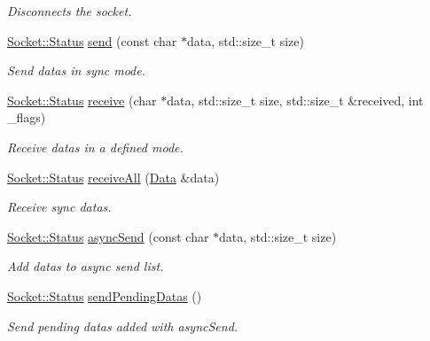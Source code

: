 \begin{DoxyCompactItemize}
\begin{DoxyCompactList}\small\item\em Disconnects the socket. \end{DoxyCompactList}\item 
\hyperlink{classmognetwork_1_1_socket_aa187a8394ac0d6203af0ec7f021ca15f}{Socket\-::\-Status} \hyperlink{classmognetwork_1_1_tcp_socket_a6cd80d53f05a4d91ed1a66e17e9a3d54}{send} (const char $\ast$data, std\-::size\-\_\-t size)
\begin{DoxyCompactList}\small\item\em Send datas in sync mode. \end{DoxyCompactList}\item 
\hyperlink{classmognetwork_1_1_socket_aa187a8394ac0d6203af0ec7f021ca15f}{Socket\-::\-Status} \hyperlink{classmognetwork_1_1_tcp_socket_a44fd93d5f7bcf3d155a93e4db6d5f2e9}{receive} (char $\ast$data, std\-::size\-\_\-t size, std\-::size\-\_\-t \&received, int \-\_\-flags)
\begin{DoxyCompactList}\small\item\em Receive datas in a defined mode. \end{DoxyCompactList}\item 
\hyperlink{classmognetwork_1_1_socket_aa187a8394ac0d6203af0ec7f021ca15f}{Socket\-::\-Status} \hyperlink{classmognetwork_1_1_tcp_socket_a1ece90a4a6cf0482da562bae39786d5b}{receive\-All} (\hyperlink{classmognetwork_1_1_tcp_socket_aa80d910649a16cedb6c98297e5893ed1}{Data} \&data)
\begin{DoxyCompactList}\small\item\em Receive sync datas. \end{DoxyCompactList}\item 
\hyperlink{classmognetwork_1_1_socket_aa187a8394ac0d6203af0ec7f021ca15f}{Socket\-::\-Status} \hyperlink{classmognetwork_1_1_tcp_socket_ae136e74283e5e8d0704c52d8110f1896}{async\-Send} (const char $\ast$data, std\-::size\-\_\-t size)
\begin{DoxyCompactList}\small\item\em Add datas to async send list. \end{DoxyCompactList}\item 
\hyperlink{classmognetwork_1_1_socket_aa187a8394ac0d6203af0ec7f021ca15f}{Socket\-::\-Status} \hyperlink{classmognetwork_1_1_tcp_socket_afbb854293f7f8e404bb553e5c5ba1277}{send\-Pending\-Datas} ()
\begin{DoxyCompactList}\small\item\em Send pending datas added with async\-Send. \end{DoxyCompactList}\item 

\end{DoxyCompactItemize}
